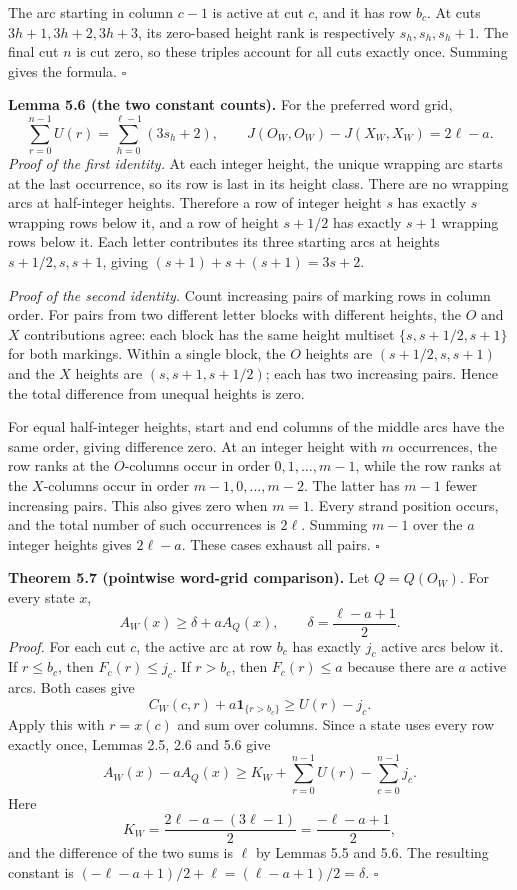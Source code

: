 \documentclass[11pt,a4paper]{article}
\begin{document}
The arc starting in column $c-1$ is active at cut $c$, and it
has row $b_c$. At cuts $3h+1,3h+2,3h+3$, its zero-based height
rank is respectively $s_h,s_h,s_h+1$. The final cut $n$ is cut
zero, so these triples account for all cuts exactly once.
Summing gives the formula. $\square$

\textbf{Lemma 5.6 (the two constant counts).}
For the preferred word grid,
\[
\sum_{r=0}^{n-1}U(r)=\sum_{h=0}^{\ell-1}(3s_h+2),
\qquad
J(O_W,O_W)-J(X_W,X_W)=2\ell-a.
\]
\textit{Proof of the first identity.}
At each integer height, the unique wrapping arc starts at the
last occurrence, so its row is last in its height class.
There are no wrapping arcs at half-integer heights. Therefore
a row of integer height $s$ has exactly $s$ wrapping rows below
it, and a row of height $s+1/2$ has exactly $s+1$ wrapping rows
below it. Each letter contributes its three starting arcs at
heights $s+1/2,s,s+1$, giving $(s+1)+s+(s+1)=3s+2$.

\textit{Proof of the second identity.}
Count increasing pairs of marking rows in column order.
For pairs from two different letter blocks with different
heights, the $O$ and $X$ contributions agree: each block has
the same height multiset $\{s,s+1/2,s+1\}$ for both markings.
Within a single block, the $O$ heights are $(s+1/2,s,s+1)$
and the $X$ heights are $(s,s+1,s+1/2)$; each has two
increasing pairs. Hence the total difference from unequal
heights is zero.

For equal half-integer heights, start and end columns of the
middle arcs have the same order, giving difference zero.
At an integer height with $m$ occurrences, the row ranks at
the $O$-columns occur in order $0,1,\ldots,m-1$, while the
row ranks at the $X$-columns occur in order
$m-1,0,\ldots,m-2$. The latter has $m-1$ fewer increasing
pairs. This also gives zero when $m=1$.
Every strand position occurs, and the total number of such
occurrences is $2\ell$. Summing $m-1$ over the $a$ integer
heights gives $2\ell-a$. These cases exhaust all pairs.
$\square$

\textbf{Theorem 5.7 (pointwise word-grid comparison).}
Let $Q=Q(O_W)$. For every state $x$,
\[
A_W(x)\ge\delta+aA_Q(x),\qquad
\delta=\frac{\ell-a+1}{2}.
\]
\textit{Proof.}
For each cut $c$, the active arc at row $b_c$ has exactly
$j_c$ active arcs below it. If $r\le b_c$, then
$F_c(r)\le j_c$. If $r>b_c$, then $F_c(r)\le a$ because
there are $a$ active arcs. Both cases give
\[
C_W(c,r)+a\mathbf1_{\{r>b_c\}}
\ge U(r)-j_c.
\]
Apply this with $r=x(c)$ and sum over columns. Since a state
uses every row exactly once, Lemmas 2.5, 2.6 and 5.6 give
\[
A_W(x)-aA_Q(x)
\ge K_W+\sum_{r=0}^{n-1}U(r)-\sum_{c=0}^{n-1}j_c.
\]
Here
\[
K_W=\frac{2\ell-a-(3\ell-1)}{2}
=\frac{-\ell-a+1}{2},
\]
and the difference of the two sums is $\ell$ by Lemmas 5.5
and 5.6. The resulting constant is
$(-\ell-a+1)/2+\ell=(\ell-a+1)/2=\delta$.
$\square$
\end{document}
